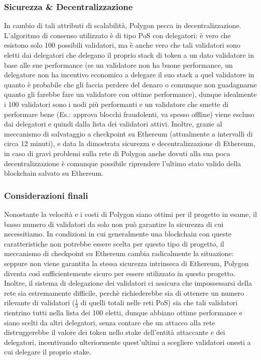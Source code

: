 \documentclass[a4paper, 12pt]{article}
\begin{document}
\subsubsection*{Sicurezza \& Decentralizzazione}
In cambio di tali attributi di scalabilità, Polygon pecca in decentralizzazione.
L'algoritmo di consenso utilizzato è di tipo PoS con delegatori: è vero che esistono solo 100 possibili validatori, ma è anche vero che tali validatori sono eletti dai delegatori che delegano il proprio stack di token a un dato validatore in base alle sue performance (se un validatore non ha buone performance, un delegatore non ha incentivo economico a delegare il suo stack a quel validatore in quanto è probabile che gli faccia perdere del denaro o comunque non guadagnarne quanto gli farebbe fare un validatore con ottime performance), dunque idealmente i 100 validatori sono i nodi più performanti e un validatore che smette di performare bene (Es.: approva blocchi fraudolenti, va spesso offline) viene escluso dai delegatori e quindi dalla lista dei validatori attivi.
Inoltre, grazie al meccanismo di salvataggio a checkpoint su Ethereum (attualmente a intervalli di circa 12 minuti), e data la dimostrata sicurezza e decentralizzazione di Ethereum,
in caso di gravi problemi sulla rete di Polygon anche dovuti alla sua poca decentralizzazione è comunque possibile riprendere l'ultimo stato valido della blockchain salvato su Ethereum.

\subsubsection*{Considerazioni finali}
Nonostante la velocità e i costi di Polygon siano ottimi per il progetto in esame, il basso numero di validatori da solo non può garantire la sicurezza di cui necessitiamo.
In condizioni in cui generalmente una blockchain con queste caratteristiche non potrebbe essere scelta per questo tipo di progetto, il meccanismo di checkpoint su Ethereum cambia radicalmente la situazione: seppure non viene garantita la stessa sicurezza intrinseca di Ethereum, Polygon diventa così sufficientemente sicuro per essere utilizzato in questo progetto.
Inoltre, il sistema di delegazione dei validatori ci assicura che impossessarsi della rete sia estremamente difficile, perchè richiederebbe sia di ottenere un numero rilevante di validatori ($\frac{1}{3}$ di quelli totali nelle reti PoS) sia che tali validatori rientrino tutti nella lista dei 100 eletti, dunque abbiano ottime performance e siano scelti da altri delegatori,
senza contare che un attacco alla rete distruggerebbe il valore dei token nello stake dell'entità attaccante e dei delegatori, incentivando ulteriormente quest'ultimi a scegliere validatori onesti a cui delegare il proprio stake.
\end{document}
